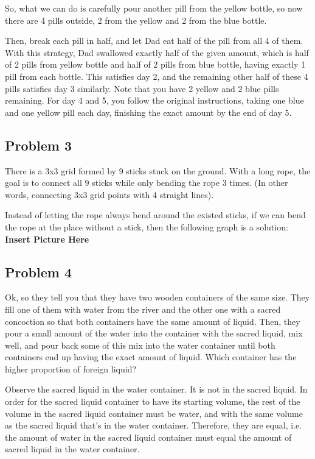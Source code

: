 \documentclass{article}
\begin{document}
So, what we can do is carefully pour another pill from the yellow bottle, so now there are 4 pills outside, 2 from the yellow and 2 from the blue bottle.

Then, break each pill in half, and let Dad eat half of the pill from all 4 of them. With this strategy, Dad swallowed exactly half of the given amount, 
which is half of 2 pills from yellow bottle and half of 2 pills from blue bottle, having exactly 1 pill from each bottle. This satisfies day 2, 
and the remaining other half of these 4 pills satisfies day 3 similarly. Note that you have 2 yellow and 2 blue pills remaining.
For day 4 and 5, you follow the original instructions, taking one blue and one yellow pill each day, finishing the exact amount by the end of day 5.

\hfill

\subsection{Problem 3}
There is a 3x3 grid formed by 9 sticks stuck on the ground. With a long rope, the goal is to connect all 9 sticks while only bending the rope 3 times. 
(In other words, connecting 3x3 grid points with 4 straight lines).

Instead of letting the rope always bend around the existed sticks, if we can bend the rope at the place without a stick, then the following graph is a solution:
\textbf{Insert Picture Here}

\hfill

\subsection{Problem 4}
Ok, so they tell you that they have two wooden containers of the same size. They fill one of them with water from the river and the other one with a sacred concoction 
so that both containers have the same amount of liquid. 
Then, they pour a small amount of the water into the container with the sacred liquid, mix well, and pour back some of this mix into the water container 
until both containers end up having the exact amount of liquid. Which container has the higher proportion of foreign liquid?

Observe the sacred liquid in the water container. It is not in the sacred liquid. In order for the sacred liquid container to have its starting volume, 
the rest of the volume in the sacred liquid container must be water, and with the same volume as the sacred liquid that’s in the water container. 
Therefore, they are equal, i.e. the amount of water in the sacred liquid container must equal the amount of sacred liquid in the water container.
\end{document}
